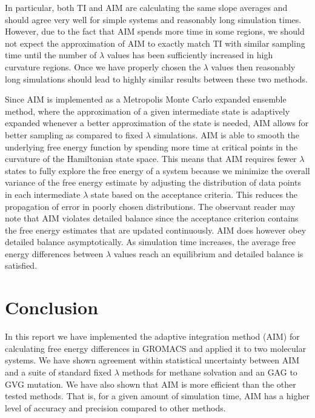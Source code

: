 \documentclass[fleqn,10pt,lineno]{wlpeerj} %
\begin{document}
In particular, both TI and AIM are calculating the same slope averages and should agree very well for simple systems and reasonably long simulation times. However, due to the fact that AIM spends more time in some regions, we should not expect the approximation of AIM to exactly match TI with similar sampling time until the number of $\lambda$ values has been sufficiently increased in high curvature regions. Once we have properly chosen the $\lambda$ values then reasonably long simulations should lead to highly similar results between these two methods.

Since AIM is implemented as a Metropolis Monte Carlo \citep{Metropolis1953} expanded ensemble \citep{Lyubartsev1996} method, where the approximation of a given intermediate state is adaptively expanded whenever a better approximation of the state is needed, AIM allows for better sampling as compared to fixed $\lambda$ simulations. AIM is able to smooth the underlying free energy function by spending more time at critical points in the curvature of the Hamiltonian state space. This means that AIM requires fewer $\lambda$ states to fully explore the free energy of a system because we minimize the overall variance of the free energy estimate by adjusting the distribution of data points in each intermediate $\lambda$ state based on the acceptance criteria. This reduces the propagation of error in poorly chosen distributions. 
The observant reader may note that AIM violates detailed balance since the acceptance criterion contains the free energy estimates that are updated continuously. AIM does however obey detailed balance asymptotically. As simulation time increases, the average free energy differences between $\lambda$ values reach an equilibrium and detailed balance is satisfied. 

\section*{Conclusion} \label{conclusion} 

In this report we have implemented the adaptive integration method (AIM) for calculating free energy differences in GROMACS and applied it to two molecular systems. We have shown agreement within statistical uncertainty between AIM and a suite of standard fixed $\lambda$ methods for methane solvation and an GAG to GVG mutation. We have also shown that AIM is more efficient than the other tested methods. That is, for a given amount of simulation time, AIM has a higher level of accuracy and precision compared to other methods.
\end{document}
